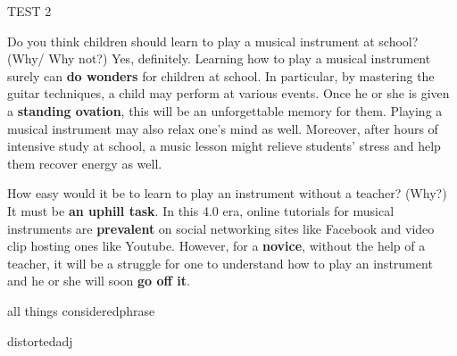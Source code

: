 \begin{glossarymc}[Cambridge 6]
\begin{test}{TEST 2}
    \begin{qa}{Do you think children should learn to play a musical instrument at school? (Why/ Why not?)}
    Yes, definitely. Learning how to play a musical instrument surely can \textbf{do wonders} for children at school. In particular, by mastering the guitar techniques, a child may perform at various events. Once he or she is given a \textbf{standing ovation}, this will be an unforgettable memory for them. Playing a musical instrument may also relax one's mind as well. Moreover, after hours of intensive study at school, a music lesson might relieve students' stress and help them recover energy as well.
    \end{qa}

    \begin{qa}{How easy would it be to learn to play an instrument without a teacher? (Why?)}
    It must be \textbf{an uphill task}. In this 4.0 era, online tutorials for musical instruments are \textbf{prevalent} on social networking sites like Facebook and video clip hosting ones like Youtube. However, for a \textbf{novice}, without the help of a teacher, it will be a struggle for one to understand how to play an instrument and he or she will soon \textbf{go off it}.
    \end{qa}

        \begin{VocabExplain}[Part 1]
            \begin{ExplainCard}{all things considered}{phrase}
            \end{ExplainCard}

        \begin{ExplainCard}{distorted}{adj}
        \end{ExplainCard}


\end{VocabExplain}
\end{test}
\end{glossarymc}
